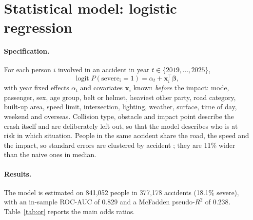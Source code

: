 \documentclass[11pt,a4paper]{article}
\begin{document}
\section{Statistical model: logistic regression}

\paragraph{Specification.} For each person $i$ involved in an accident in year $t \in \{2019,\dots,2025\}$,
\begin{equation}
\operatorname{logit} P(\text{severe}_i = 1) = \alpha_t + \boldsymbol{x}_i^\top \boldsymbol{\beta},
\end{equation}
with year fixed effects $\alpha_t$ and covariates $\boldsymbol{x}_i$ known \emph{before} the impact: mode,
passenger, sex, age group, belt or helmet, heaviest other party, road category, built-up area, speed
limit, intersection, lighting, weather, surface, time of day, weekend and overseas. Collision type,
obstacle and impact point describe the crash itself and are deliberately left out, so that the model
describes who is at risk in which situation. People in the same accident share the road, the speed and
the impact, so standard errors are clustered by accident \cite{cameron}; they are 11\% wider than the
naive ones in median.

\paragraph{Results.} The model is estimated on 841,052 people in 377,178 accidents (18.1\% severe), with an
in-sample ROC-AUC of 0.829 and a McFadden pseudo-$R^2$ of 0.238. Table~\ref{tab:or} reports the main odds
ratios.
\end{document}
